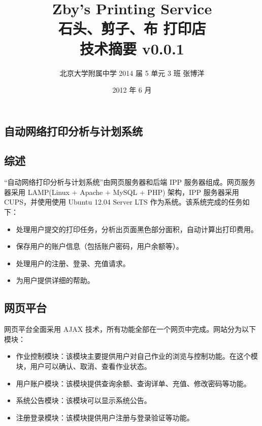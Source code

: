 \documentclass{article}
\begin{document}
\begin{CJK}{UTF8}{gbsn}
\title{Zby's Printing Service\\石头、剪子、布 打印店\\技术摘要 v0.0.1}
\author{北京大学附属中学 2014 届 5 单元 3 班 张博洋}
\date{2012 年 6 月}
\maketitle
\thispagestyle{empty}
\newpage

\renewcommand\contentsname{目\quad 录}
\renewcommand\figurename{图}
\renewcommand\tablename{表}
\tableofcontents
\thispagestyle{empty}
\newpage
{}
\CJKindent

\section{自动网络打印分析与计划系统}
	\subsection{综述}
		“自动网络打印分析与计划系统”由网页服务器和后端 IPP 服务器组成。网页服务器采用 LAMP(Linux + Apache + MySQL + PHP) 架构，IPP 服务器采用 CUPS，并使用使用 Ubuntu 12.04 Server LTS 作为系统。该系统完成的任务如下：
		\begin{itemize}
			\item{处理用户提交的打印任务，分析出页面黑色部分面积，自动计算出打印费用。}
			\item{保存用户的账户信息（包括账户密码，用户余额等）。}
			\item{处理用户的注册、登录、充值请求。}
			\item{为用户提供详细的帮助。}
		\end{itemize}
		
	\subsection{网页平台}
		网页平台全面采用 AJAX 技术，所有功能全部在一个网页中完成。网站分为以下模块：
		\begin{itemize}
			\item{作业控制模块：该模块主要提供用户对自己作业的浏览与控制功能。在这个模块，用户可以确认、取消、查看作业状态。}
			\item{用户账户模块：该模块提供查询余额、查询详单、充值、修改密码等功能。}
			\item{系统公告模块：该模块可以显示系统公告。}
			\item{注册登录模块：该模块提供用户注册与登录验证等功能。}
		\end{itemize}
	

\end{CJK}
\end{document}
